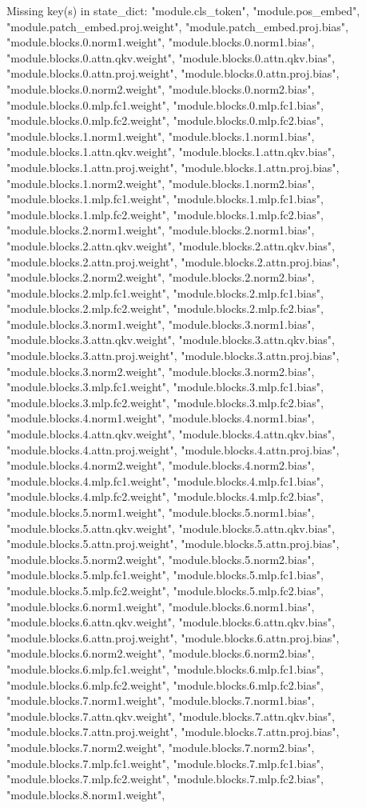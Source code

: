 	Missing key(s) in state_dict: "module.cls_token", "module.pos_embed", "module.patch_embed.proj.weight", "module.patch_embed.proj.bias", "module.blocks.0.norm1.weight", "module.blocks.0.norm1.bias", "module.blocks.0.attn.qkv.weight", "module.blocks.0.attn.qkv.bias", "module.blocks.0.attn.proj.weight", "module.blocks.0.attn.proj.bias", "module.blocks.0.norm2.weight", "module.blocks.0.norm2.bias", "module.blocks.0.mlp.fc1.weight", "module.blocks.0.mlp.fc1.bias", "module.blocks.0.mlp.fc2.weight", "module.blocks.0.mlp.fc2.bias", "module.blocks.1.norm1.weight", "module.blocks.1.norm1.bias", "module.blocks.1.attn.qkv.weight", "module.blocks.1.attn.qkv.bias", "module.blocks.1.attn.proj.weight", "module.blocks.1.attn.proj.bias", "module.blocks.1.norm2.weight", "module.blocks.1.norm2.bias", "module.blocks.1.mlp.fc1.weight", "module.blocks.1.mlp.fc1.bias", "module.blocks.1.mlp.fc2.weight", "module.blocks.1.mlp.fc2.bias", "module.blocks.2.norm1.weight", "module.blocks.2.norm1.bias", "module.blocks.2.attn.qkv.weight", "module.blocks.2.attn.qkv.bias", "module.blocks.2.attn.proj.weight", "module.blocks.2.attn.proj.bias", "module.blocks.2.norm2.weight", "module.blocks.2.norm2.bias", "module.blocks.2.mlp.fc1.weight", "module.blocks.2.mlp.fc1.bias", "module.blocks.2.mlp.fc2.weight", "module.blocks.2.mlp.fc2.bias", "module.blocks.3.norm1.weight", "module.blocks.3.norm1.bias", "module.blocks.3.attn.qkv.weight", "module.blocks.3.attn.qkv.bias", "module.blocks.3.attn.proj.weight", "module.blocks.3.attn.proj.bias", "module.blocks.3.norm2.weight", "module.blocks.3.norm2.bias", "module.blocks.3.mlp.fc1.weight", "module.blocks.3.mlp.fc1.bias", "module.blocks.3.mlp.fc2.weight", "module.blocks.3.mlp.fc2.bias", "module.blocks.4.norm1.weight", "module.blocks.4.norm1.bias", "module.blocks.4.attn.qkv.weight", "module.blocks.4.attn.qkv.bias", "module.blocks.4.attn.proj.weight", "module.blocks.4.attn.proj.bias", "module.blocks.4.norm2.weight", "module.blocks.4.norm2.bias", "module.blocks.4.mlp.fc1.weight", "module.blocks.4.mlp.fc1.bias", "module.blocks.4.mlp.fc2.weight", "module.blocks.4.mlp.fc2.bias", "module.blocks.5.norm1.weight", "module.blocks.5.norm1.bias", "module.blocks.5.attn.qkv.weight", "module.blocks.5.attn.qkv.bias", "module.blocks.5.attn.proj.weight", "module.blocks.5.attn.proj.bias", "module.blocks.5.norm2.weight", "module.blocks.5.norm2.bias", "module.blocks.5.mlp.fc1.weight", "module.blocks.5.mlp.fc1.bias", "module.blocks.5.mlp.fc2.weight", "module.blocks.5.mlp.fc2.bias", "module.blocks.6.norm1.weight", "module.blocks.6.norm1.bias", "module.blocks.6.attn.qkv.weight", "module.blocks.6.attn.qkv.bias", "module.blocks.6.attn.proj.weight", "module.blocks.6.attn.proj.bias", "module.blocks.6.norm2.weight", "module.blocks.6.norm2.bias", "module.blocks.6.mlp.fc1.weight", "module.blocks.6.mlp.fc1.bias", "module.blocks.6.mlp.fc2.weight", "module.blocks.6.mlp.fc2.bias", "module.blocks.7.norm1.weight", "module.blocks.7.norm1.bias", "module.blocks.7.attn.qkv.weight", "module.blocks.7.attn.qkv.bias", "module.blocks.7.attn.proj.weight", "module.blocks.7.attn.proj.bias", "module.blocks.7.norm2.weight", "module.blocks.7.norm2.bias", "module.blocks.7.mlp.fc1.weight", "module.blocks.7.mlp.fc1.bias", "module.blocks.7.mlp.fc2.weight", "module.blocks.7.mlp.fc2.bias", "module.blocks.8.norm1.weight", 